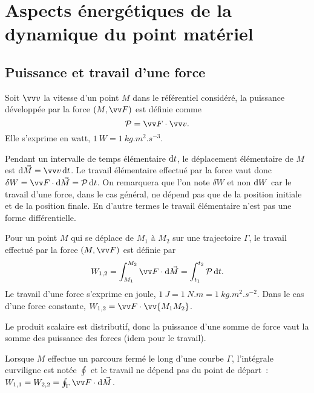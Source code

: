\chapter{Aspects énergétiques de la dynamique du point matériel}
\label{chap:aspectenergetiques}
\minitoc
\minilof
\minilot

\section{Puissance et travail d'une force}
\label{chap4-sec:puissanceettravail}
\begin{defdef}[Puissance]
  Soit \(\vvv\) la vitesse d'un point \(M\) dans le référentiel considéré, la puissance développée par la force \((M, \vF)\) est définie comme
  \begin{equation}
    \P=\vF \cdot \vvv.
  \end{equation}
  Elle s'exprime en watt, \(\SI{1}{W}=\SI{1}{kg.m^2.s^{-3}}\).
\end{defdef}
 Pendant un intervalle de temps élémentaire \(\mathop{}\mathopen{}\mathrm{d} t\), le déplacement élémentaire de \(M\) est \(\diff \vec{M} = \vvv \diff t\). Le travail élémentaire effectué par la force vaut donc \(\delta W = \vF \cdot \diff \vec{M} = \P \diff t\). On remarquera que l'on note \(\delta W\) et non \(\mathop{}\mathopen{}\mathrm{d} W\) car le travail d'une force, dans le cas général, ne dépend pas que de la position initiale et de la position finale. En d'autre termes le travail élémentaire n'est pas une forme différentielle.
\begin{defdef}[Travail]
  Pour un point \(M\) qui se déplace de \(M_1\) à \(M_2\) sur une trajectoire \(\Gamma\), le travail effectué par la force \((M, \vF)\) est définie par
\begin{equation}
  W_{1, 2} = \int_{M_1}^{M_2} \vF \cdot \diff \vec{M} = \int_{t_1}^{t_2} \P \diff t.
\end{equation}
Le travail d'une force s'exprime en joule, \(\SI{1}{J}=\SI{1}{N.m}=\SI{1}{kg.m^2.s^{-2}}\). Dans le cas d'une force constante, \(W_{1, 2}=\vF \cdot \vv{M_1M_2}\).
\end{defdef}
 Le produit scalaire est distributif, donc la puissance d'une somme de force vaut la somme des puissance des forces (idem pour le travail).

Lorsque \(M\) effectue un parcours fermé le long d'une courbe \(\Gamma\), l'intégrale curviligne est notée \(\oint\) et le travail ne dépend pas du point de départ~: \(W_{1,1} = W_{2,2} = \oint_\Gamma \vF \cdot \diff \vec{M}\).

